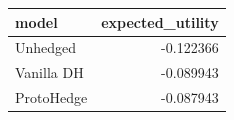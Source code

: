 \begin{tabular}{lr}
\toprule
model & expected_utility \\
\midrule
Unhedged & -0.122366 \\
Vanilla DH & -0.089943 \\
ProtoHedge & -0.087943 \\
\bottomrule
\end{tabular}
